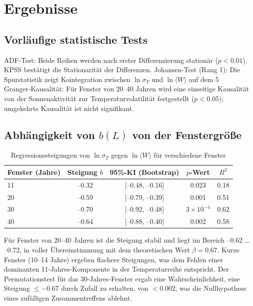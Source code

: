 \documentclass[12pt,a4paper]{article}
\newcommand{\be}{\beta}
\begin{document}
	\section{Ergebnisse}
	
	\subsection{Vorläufige statistische Tests}
	
	ADF-Test: Beide Reihen werden nach erster Differenzierung stationär (\(p < 0.01\)). KPSS bestätigt die Stationarität der Differenzen.  
	Johansen-Test (Rang 1): Die Spurstatistik zeigt Kointegration zwischen \(\ln \sigma_T\) und \(\ln \langle W \rangle\) auf dem 5%
	Granger‑Kausalität: Für Fenster von 20–40 Jahren wird eine einseitige Kausalität von der Sonnenaktivität zur Temperaturvolatilität festgestellt (\(p < 0.05\)); umgekehrte Kausalität ist nicht signifikant.
	
	\subsection{Abhängigkeit von \(b(L)\) von der Fenstergröße}
	
	\begin{table}[htbp]
		\centering
		\caption{Regressionssteigungen von \(\ln \sigma_T\) gegen \(\ln \langle W \rangle\) für verschiedene Fenster}
		\label{tab:slopes}
		\begin{tabular}{@{}lcccc@{}}
			\toprule
			Fenster (Jahre) & Steigung \(b\) & 95\%-KI (Bootstrap) & \(p\)-Wert & \(R^2\) \\
			\midrule
			11 & –0.32 & [–0.48, –0.16] & 0.023 & 0.18 \\
			20 & –0.59 & [–0.79, –0.39] & 0.001 & 0.51 \\
			30 & –0.70 & [–0.92, –0.48] & \(3\times10^{-4}\) & 0.62 \\
			40 & –0.64 & [–0.88, –0.40] & 0.002 & 0.58 \\
			\bottomrule
		\end{tabular}
	\end{table}
	
	Für Fenster von 20–40 Jahren ist die Steigung stabil und liegt im Bereich –0.62 … –0.72, in voller Übereinstimmung mit dem theoretischen Wert \(\be = 0.67\). Kurze Fenster (10–14 Jahre) ergeben flachere Steigungen, was dem Fehlen einer dominanten 11‑Jahres‑Komponente in der Temperaturreihe entspricht.  
	Der Permutationstest für das 30‑Jahres‑Fenster ergab eine Wahrscheinlichkeit, eine Steigung \(\le -0.67\) durch Zufall zu erhalten, von \(<0.002\), was die Nullhypothese eines zufälligen Zusammentreffens ablehnt.
	
\end{document}
